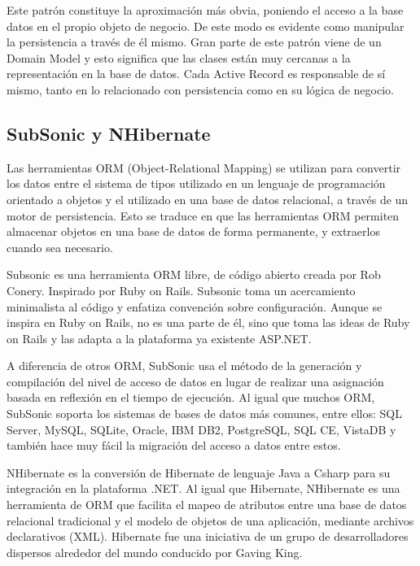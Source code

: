 \documentclass[preprint,12pt]{elsarticle}
\begin{document}
Este patrón constituye la aproximación más obvia, poniendo el acceso a la base datos en el propio objeto de negocio. De este modo es evidente como manipular la persistencia a través de él mismo. Gran parte de este patrón viene de un Domain Model y esto significa que las clases están muy cercanas a la representación en la base de datos. Cada Active Record es responsable de sí mismo, tanto en lo
relacionado con persistencia como en su lógica de negocio.

\cite{referenciaQuispe2}

\subsection{SubSonic y NHibernate}

Las herramientas ORM (Object-Relational Mapping) se utilizan para convertir los datos entre el sistema de tipos utilizado en un lenguaje de programación orientado a objetos y el utilizado en una base de datos relacional, a través de un motor de persistencia. Esto se traduce en que las herramientas ORM permiten almacenar objetos en una base de datos de forma permanente, y extraerlos cuando sea
necesario.

Subsonic es una herramienta ORM libre, de código abierto creada por Rob Conery. Inspirado por Ruby on Rails. Subsonic toma un acercamiento minimalista al código y enfatiza convención sobre configuración. Aunque se inspira en Ruby on Rails, no es una parte de él, sino que toma las ideas de Ruby on Rails y las adapta a la plataforma ya existente ASP.NET.

A diferencia de otros ORM, SubSonic usa el método de la generación y compilación del nivel de acceso de datos en lugar de realizar una asignación basada en reflexión en el tiempo de ejecución. Al igual que muchos ORM, SubSonic soporta los sistemas de bases de datos más comunes, entre ellos: SQL Server, MySQL, SQLite, Oracle, IBM DB2, PostgreSQL, SQL CE, VistaDB y también hace muy fácil la migración del
acceso a datos entre estos.

NHibernate es la conversión de Hibernate de lenguaje Java a Csharp para su integración en la plataforma .NET. Al igual que Hibernate, NHibernate es una herramienta de ORM que facilita el mapeo de atributos entre una base de datos relacional tradicional y el modelo de objetos de una aplicación, mediante archivos declarativos (XML). Hibernate fue una iniciativa de un grupo de desarrolladores dispersos
alrededor del mundo conducido por Gaving King.
\end{document}
